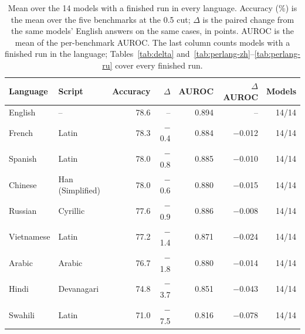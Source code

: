 \begin{table}[t]
\centering
\caption{Mean over the 14 models with a finished run in every language. Accuracy (\%) is the mean over the five benchmarks at the 0.5 cut; $\Delta$ is the paired change from the same models' English answers on the same cases, in points. AUROC is the mean of the per-benchmark AUROC. The last column counts models with a finished run in the language; Tables~\ref{tab:delta} and~\ref{tab:perlang-zh}--\ref{tab:perlang-ru} cover every finished run.}
\label{tab:overall}
\small
\setlength{\tabcolsep}{4pt}
\begin{tabular}{@{}llrrrrr@{}}
\toprule
Language & Script & Accuracy & $\Delta$ & AUROC & $\Delta$AUROC & Models \\
\midrule
English & -- & 78.6 & -- & 0.894 & -- & 14/14 \\
\midrule
French & Latin & 78.3 & $-$0.4 & 0.884 & $-$0.012 & 14/14 \\
Spanish & Latin & 78.0 & $-$0.8 & 0.885 & $-$0.010 & 14/14 \\
Chinese & Han (Simplified) & 78.0 & $-$0.6 & 0.880 & $-$0.015 & 14/14 \\
Russian & Cyrillic & 77.6 & $-$0.9 & 0.886 & $-$0.008 & 14/14 \\
Vietnamese & Latin & 77.2 & $-$1.4 & 0.871 & $-$0.024 & 14/14 \\
Arabic & Arabic & 76.7 & $-$1.8 & 0.880 & $-$0.014 & 14/14 \\
Hindi & Devanagari & 74.8 & $-$3.7 & 0.851 & $-$0.043 & 14/14 \\
Swahili & Latin & 71.0 & $-$7.5 & 0.816 & $-$0.078 & 14/14 \\
\bottomrule
\end{tabular}
\end{table}
